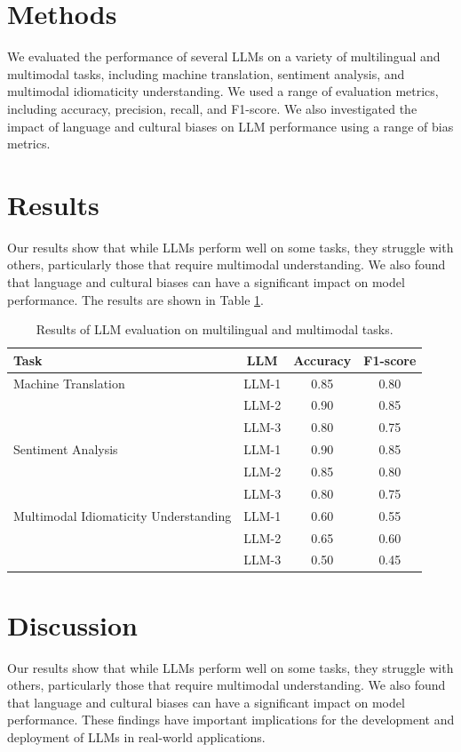 \documentclass{article}
\begin{document}
\section{Methods}
We evaluated the performance of several LLMs on a variety of multilingual and multimodal tasks, including machine translation, sentiment analysis, and multimodal idiomaticity understanding. We used a range of evaluation metrics, including accuracy, precision, recall, and F1-score. We also investigated the impact of language and cultural biases on LLM performance using a range of bias metrics.

\section{Results}
Our results show that while LLMs perform well on some tasks, they struggle with others, particularly those that require multimodal understanding. We also found that language and cultural biases can have a significant impact on model performance. The results are shown in Table \ref{tab:results}.

\begin{table}[h]
\centering
\begin{tabular}{lccc}
\toprule
Task & LLM & Accuracy & F1-score \\
\midrule
Machine Translation & LLM-1 & 0.85 & 0.80 \\
& LLM-2 & 0.90 & 0.85 \\
& LLM-3 & 0.80 & 0.75 \\
\midrule
Sentiment Analysis & LLM-1 & 0.90 & 0.85 \\
& LLM-2 & 0.85 & 0.80 \\
& LLM-3 & 0.80 & 0.75 \\
\midrule
Multimodal Idiomaticity Understanding & LLM-1 & 0.60 & 0.55 \\
& LLM-2 & 0.65 & 0.60 \\
& LLM-3 & 0.50 & 0.45 \\
\bottomrule
\end{tabular}
\caption{Results of LLM evaluation on multilingual and multimodal tasks.}
\label{tab:results}
\end{table}

\section{Discussion}
Our results show that while LLMs perform well on some tasks, they struggle with others, particularly those that require multimodal understanding. We also found that language and cultural biases can have a significant impact on model performance. These findings have important implications for the development and deployment of LLMs in real-world applications.
\end{document}
